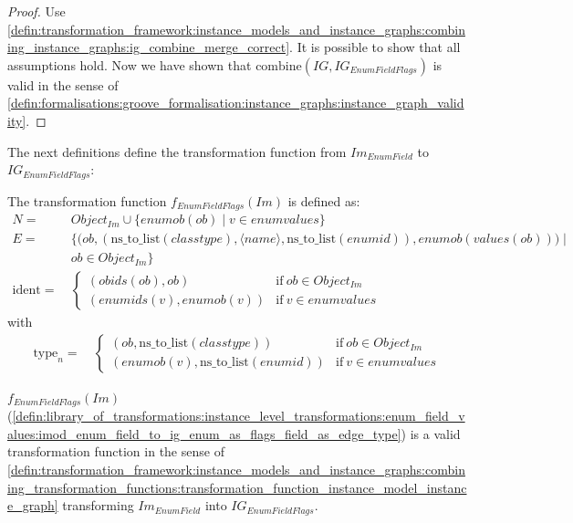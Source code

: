 \begin{proof}
Use \cref{defin:transformation_framework:instance_models_and_instance_graphs:combining_instance_graphs:ig_combine_merge_correct}. It is possible to show that all assumptions hold. Now we have shown that $\mathrm{combine}(IG, IG_{EnumFieldFlags})$ is valid in the sense of \cref{defin:formalisations:groove_formalisation:instance_graphs:instance_graph_validity}.
\end{proof}

The next definitions define the transformation function from $Im_{EnumField}$ to $IG_{EnumFieldFlags}$:

\begin{defin}
\label{defin:library_of_transformations:instance_level_transformations:enum_field_values:imod_enum_field_to_ig_enum_as_flags_field_as_edge_type}
The transformation function $f_{EnumFieldFlags}(Im)$ is defined as:
\begin{align*}
N =\ & Object_{Im} \cup \{enumob(ob) \mid v \in enumvalues\}  \\
E =\ & \big\{\big(ob, (\mathrm{ns\_\!to\_\!list}(classtype), \langle name \rangle, \mathrm{ns\_\!to\_\!list}(enumid)), enumob(values(ob))\big) \mid \\&ob \in Object_{Im} \big\} \\
\mathrm{ident} =\ & \begin{cases}
    (obids(ob), ob) & \mathrm{if }\ ob \in Object_{Im}\\
    (enumids(v), enumob(v)) & \mathrm{if }\ v \in enumvalues
\end{cases}
\end{align*}
with
\begin{align*}
\mathrm{type}_n =\ & \begin{cases}
    (ob, \mathrm{ns\_\!to\_\!list}(classtype)) & \mathrm{if }\ ob \in Object_{Im}\\
    (enumob(v), \mathrm{ns\_\!to\_\!list}(enumid)) & \mathrm{if }\ v \in enumvalues
\end{cases}
\end{align*}
\end{defin}

\begin{thm}
\label{defin:library_of_transformations:instance_level_transformations:enum_field_values:imod_enum_field_to_ig_enum_as_flags_field_as_edge_type_func}
$f_{EnumFieldFlags}(Im)$ (\cref{defin:library_of_transformations:instance_level_transformations:enum_field_values:imod_enum_field_to_ig_enum_as_flags_field_as_edge_type}) is a valid transformation function in the sense of \cref{defin:transformation_framework:instance_models_and_instance_graphs:combining_transformation_functions:transformation_function_instance_model_instance_graph} transforming $Im_{EnumField}$ into $IG_{EnumFieldFlags}$.
\end{thm}

